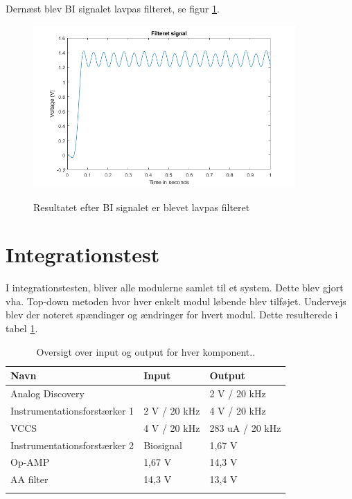 Dernæst blev BI signalet lavpas filteret, se figur \ref{fig:modultestprocessFilter}.

\begin{figure}[H] 
\centering
{\includegraphics[width=10cm]
{Figure/modultestprocessFilter}}
\caption{Resultatet efter BI signalet er blevet lavpas filteret}
\label{fig:modultestprocessFilter}
\end{figure}


\section{Integrationstest}

I integrationstesten, bliver alle modulerne samlet til et system. Dette blev gjort vha. Top-down metoden hvor hver enkelt modul løbende blev tilføjet. Undervejs blev der noteret spændinger og ændringer for hvert modul. Dette resulterede i tabel \ref{tab:inout}. 

\begin{table}[H]
\center
\begin{tabularx}{\linewidth}{l  X  X}
     \textbf{Navn}	&	\textbf{Input}		&	\textbf{Output}  \\ \midrule
     
     Analog Discovery	&		&	2 V / 20 kHz         \\   \addlinespace[2mm]
     Instrumentationsforstærker 1	&	2 V / 20 kHz	&	4 V / 20 kHz         \\   \addlinespace[2mm]
     VCCS	&	4 V / 20 kHz	&	283 uA / 20 kHz        \\   \addlinespace[2mm]
     Instrumentationsforstærker 2	&	Biosignal	&	1,67 V         \\   \addlinespace[2mm]
     Op-AMP	&	1,67 V 	&	14,3 V        \\   \addlinespace[2mm]	
     AA filter	&	14,3 V 	&	13,4 V        \\   \addlinespace[2mm]
     \bottomrule                                                                                                                   
    \end{tabularx}
    \caption {Oversigt over input og output for hver komponent..}
    \label{tab:inout}
	
\end{table}

